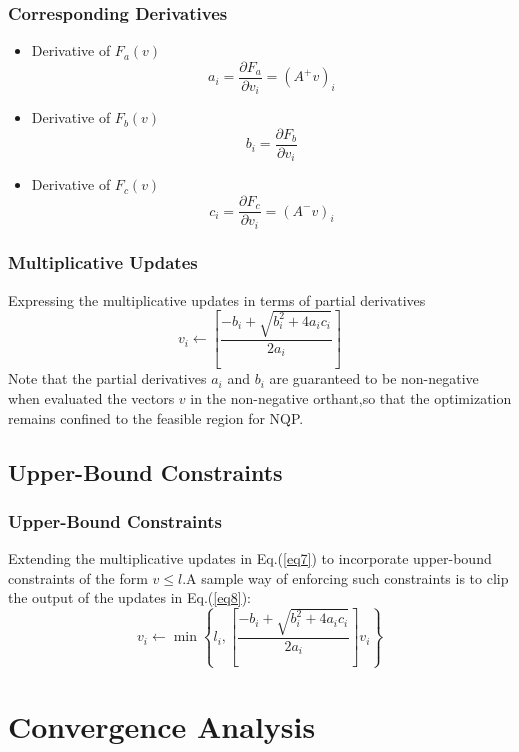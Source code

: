\documentclass{beamer}
\begin{document}
\begin{frame}\frametitle{Corresponding Derivatives}
\begin{itemize}
\item Derivative of $F_a(v)$
\begin{equation}\label{eq4}
a_i=\frac{\partial F_a}{\partial v_i}=(A^+v)_i
\end{equation}
\item Derivative of $F_b(v)$
\begin{equation}\label{eq5}
b_i=\frac{\partial F_b}{\partial v_i}
\end{equation}
\item Derivative of $F_c(v)$
\begin{equation}\label{eq6}
c_i=\frac{\partial F_c}{\partial v_i}=(A^-v)_i
\end{equation}
\end{itemize}
\end{frame}


\begin{frame}\frametitle{Multiplicative Updates}
Expressing the multiplicative updates in terms of partial derivatives
\begin{equation}\label{eq7}
v_i\longleftarrow [\frac{-b_i+\sqrt{b_i^2+4a_ic_i}}{2a_i}]
\end{equation}
Note that the partial derivatives $a_i$ and $b_i$ are guaranteed to be non-negative when evaluated the vectors $v$ in the non-negative orthant,so that the optimization remains confined to the feasible region for NQP.
\end{frame}


\subsection{Upper-Bound Constraints}
\begin{frame}\frametitle{Upper-Bound Constraints}
Extending the multiplicative updates in Eq.(\ref{eq7}) to incorporate upper-bound constraints of the form $v\leq l$.A sample way of enforcing such constraints is to clip the output of the updates in Eq.(\ref{eq8}):
\begin{equation}\label{eq8}
v_i\longleftarrow \min {\left\lbrace l_i,\left[\frac{-b_i+\sqrt{b_i^2+4a_ic_i}}{2a_i}\right]v_i\right\rbrace}
\end{equation}
\end{frame}


\section{Convergence Analysis}
\end{document}
